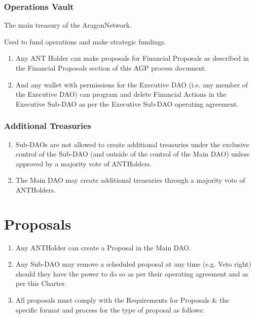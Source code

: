 \subsubsection*{Operations Vault} The main treasury of the \gls{AragonNetwork}.

Used to fund operations and make strategic fundings.
\begin{enumerate}
	\item Any \ac{ANT} Holder can make proposals for Financial Proposals as
	described in the Financial Proposals section of this \ac{AGP} process
	document.
	\item And any wallet with permissions for the Executive \ac{DAO} (i.e. any member of the Executive \ac{DAO}) can program and delete Financial Actions in the Executive Sub-\ac{DAO} as per the Executive Sub-\ac{DAO} operating agreement.
\end{enumerate}

\subsubsection*{Additional Treasuries}
\begin{enumerate}
	\item Sub-\acp{DAO} are not allowed to create additional treasuries under the exclusive control of the Sub-\ac{DAO} (and outside of the control of the Main \ac{DAO}) unless approved by a majority vote of \glspl{ANTHolder}.
	\item The Main \ac{DAO} may create additional treasuries through a majority vote of \glspl{ANTHolder}.
\end{enumerate}  


\section{Proposals}
\begin{enumerate}

\item Any \ac{ANTHolder} can create a Proposal in the Main \ac{DAO}.
\item Any Sub-\ac{DAO} may remove a scheduled proposal at any time (e.g. Veto right) should they have the power to do so as per their operating agreement and as per this Charter.
\item All proposals must comply with the Requirements for Proposals \& the specific format and process for the type of proposal as follows:

\end{enumerate}

